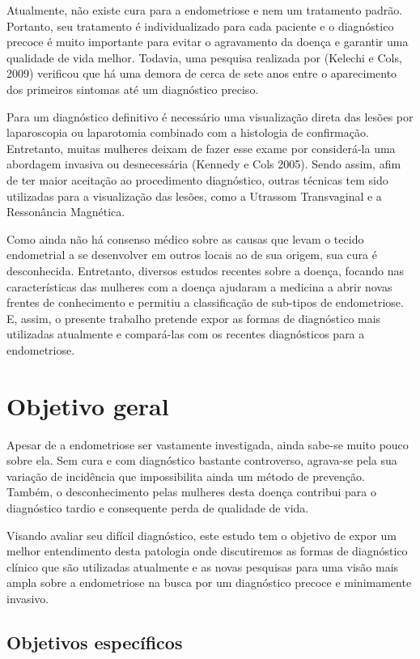 \documentclass[12pt]{article} %
\begin{document}
Atualmente, não existe cura para a endometriose e nem um tratamento
padrão. Portanto, seu tratamento é individualizado para cada paciente
e o diagnóstico precoce é muito importante para evitar o agravamento
da doença e garantir uma qualidade de vida melhor.  Todavia, uma
pesquisa realizada por (Kelechi e Cols, 2009) verificou que há uma
demora de cerca de sete anos entre o aparecimento dos primeiros
sintomas até um diagnóstico preciso.

Para um diagnóstico definitivo é necessário uma visualização direta
das lesões por laparoscopia ou laparotomia combinado com a histologia
de confirmação. Entretanto, muitas mulheres deixam de fazer esse exame
por considerá-la uma abordagem invasiva ou desnecessária (Kennedy e
Cols 2005).  Sendo assim, afim de ter maior aceitação ao procedimento
diagnóstico, outras técnicas tem sido utilizadas para a visualização
das lesões, como a Utrassom Transvaginal e a Ressonância Magnética.

Como ainda não há consenso médico sobre as causas que levam o tecido
endometrial a se desenvolver em outros locais ao de sua origem, sua
cura é desconhecida. Entretanto, diversos estudos recentes sobre a
doença, focando nas características das mulheres com a doença ajudaram
a medicina a abrir novas frentes de conhecimento e permitiu a
classificação de sub-tipos de endometriose. E, assim, o presente
trabalho pretende expor as formas de diagnóstico mais utilizadas
atualmente e compará-las com os recentes diagnósticos para a
endometriose.

\section{Objetivo geral}

Apesar de a endometriose ser vastamente investigada, ainda sabe-se
muito pouco sobre ela. Sem cura e com diagnóstico bastante controverso,
agrava-se pela sua variação de incidência que impossibilita ainda um
método de prevenção. Também, o desconhecimento pelas mulheres desta
doença contribui para o diagnóstico tardio e consequente perda de
qualidade de vida.

Visando avaliar seu difícil diagnóstico, este estudo tem o objetivo de
expor um melhor entendimento desta patologia onde discutiremos as
formas de diagnóstico clínico que são utilizadas atualmente e as novas
pesquisas para uma visão mais ampla sobre a endometriose na busca por
um diagnóstico precoce e minimamente invasivo.

\subsection{Objetivos específicos}
\end{document}
